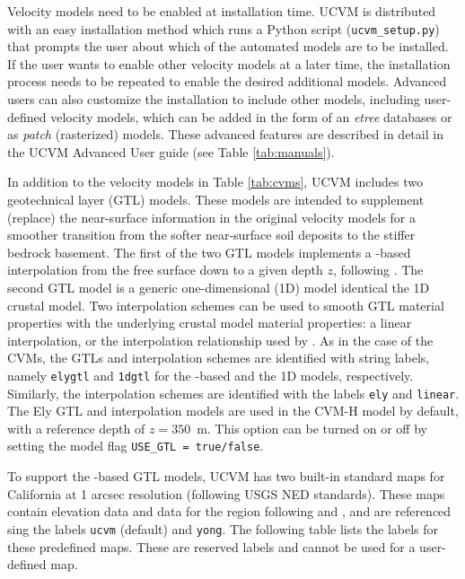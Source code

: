 Velocity models need to be enabled at installation time. UCVM is distributed with an easy installation method which runs a Python script (\texttt{ucvm\_setup.py}) that prompts the user about which of the automated models are to be installed. If the user wants to enable other velocity models at a later time, the installation process needs to be repeated to enable the desired additional models. Advanced users can also customize the installation to include other models, including user-defined velocity models, which can be added in the form of an \textit{etree} \citep{Tu_2003_Tech} databases or as \textit{patch} (rasterized) models. These advanced features are described in detail in the UCVM Advanced User guide (see Table \ref{tab:manuals}). 

In addition to the velocity models in Table \ref{tab:cvms}, UCVM includes two geotechnical layer (GTL) models. These models are intended to supplement (replace) the near-surface information in the original velocity models for a smoother transition from the softer near-surface soil deposits to the stiffer bedrock basement. The first of the two GTL models implements a \vsthirty-based interpolation from the free surface down to a given depth $z$, following \citet{Ely_2010_AGU}. The second GTL model is a generic one-dimensional (1D) model identical the 1D crustal model. Two interpolation schemes can be used to smooth GTL material properties with the underlying crustal model material properties: a linear interpolation, or the interpolation relationship used by \citet{Ely_2010_AGU}. As in the case of the CVMs, the GTLs and interpolation schemes are identified with string labels, namely \texttt{elygtl} and \texttt{1dgtl} for the \vsthirty-based and the 1D models, respectively. Similarly, the interpolation schemes are identified with the labels \texttt{ely} and \texttt{linear}. The Ely GTL and interpolation models are used in the CVM-H model by default, with a reference depth of $z=350$~m. This option can be turned on or off by setting the model flag \texttt{USE\_GTL = true/false}.

To support the \vsthirty-based GTL models, UCVM has two built-in standard maps for California at 1 arcsec resolution (following USGS NED standards). These maps contain elevation data and \vsthirty{} data for the region following \citet{Wald_2007_BSSA} and \citet{Wills_2006_BSSA}, and are referenced sing the labels \texttt{ucvm} (default) and \texttt{yong}. The following table lists the labels for these predefined maps. These are reserved labels and cannot be used for a user-defined map.

